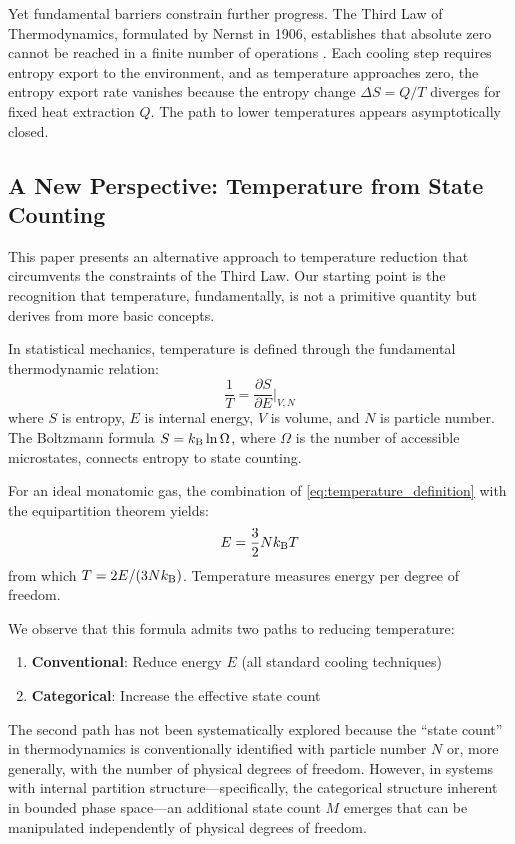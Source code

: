 Yet fundamental barriers constrain further progress. The Third Law of Thermodynamics, formulated by Nernst in 1906, establishes that absolute zero cannot be reached in a finite number of operations \cite{nernst1906,nernst1912}. Each cooling step requires entropy export to the environment, and as temperature approaches zero, the entropy export rate vanishes because the entropy change $\Delta S = Q/T$ diverges for fixed heat extraction $Q$. The path to lower temperatures appears asymptotically closed.

\subsection{A New Perspective: Temperature from State Counting}

This paper presents an alternative approach to temperature reduction that circumvents the constraints of the Third Law. Our starting point is the recognition that temperature, fundamentally, is not a primitive quantity but derives from more basic concepts.

In statistical mechanics, temperature is defined through the fundamental thermodynamic relation:
\begin{equation}
\frac{1}{T} = \frac{\partial S}{\partial E}\bigg|_{V,N}
\label{eq:temperature_definition}
\end{equation}
where $S$ is entropy, $E$ is internal energy, $V$ is volume, and $N$ is particle number. The Boltzmann formula $S = k_{\mathrm{B}} \ln \Omega$, where $\Omega$ is the number of accessible microstates, connects entropy to state counting.

For an ideal monatomic gas, the combination of \eqref{eq:temperature_definition} with the equipartition theorem yields:
\begin{equation}
E = \frac{3}{2} N k_{\mathrm{B}} T
\label{eq:equipartition}
\end{equation}
from which $T = 2E/(3Nk_{\mathrm{B}})$. Temperature measures energy per degree of freedom.

We observe that this formula admits two paths to reducing temperature:
\begin{enumerate}
    \item \textbf{Conventional}: Reduce energy $E$ (all standard cooling techniques)
    \item \textbf{Categorical}: Increase the effective state count
\end{enumerate}

The second path has not been systematically explored because the ``state count'' in thermodynamics is conventionally identified with particle number $N$ or, more generally, with the number of physical degrees of freedom. However, in systems with internal partition structure---specifically, the categorical structure inherent in bounded phase space---an additional state count $M$ emerges that can be manipulated independently of physical degrees of freedom.

